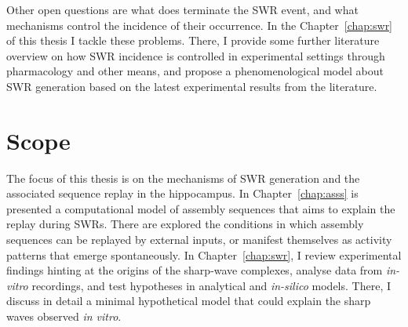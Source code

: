 
    Other open questions are what does terminate the SWR event, and what
    mechanisms control the incidence of their occurrence. In the
    Chapter~\ref{chap:swr} of this thesis I tackle these problems. There, I
    provide some further literature overview on how SWR incidence is controlled
    in experimental settings through pharmacology and other means, and propose
    a phenomenological model about SWR generation based on the latest
    experimental results from the literature.

\section{Scope}
  The focus of this thesis is on the mechanisms of SWR generation and the
  associated sequence replay in the hippocampus. In Chapter~\ref{chap:asss} is
  presented a computational model of assembly sequences that aims to explain the
  replay during SWRs. There are explored the conditions in which assembly sequences
  can be replayed by external inputs, or manifest themselves as activity
  patterns that emerge spontaneously. In Chapter~\ref{chap:swr}, I review
  experimental findings hinting at the origins of the sharp-wave complexes,
  analyse data from \textit{in-vitro} recordings, and test hypotheses in
  analytical and \textit{in-silico} models. There, I discuss in detail a
  minimal hypothetical model that could explain the sharp waves observed
  \textit{in vitro}. 
  

